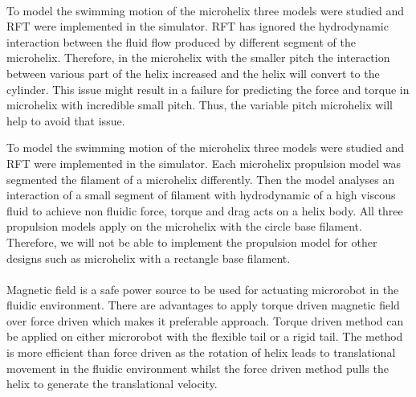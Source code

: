 \documentclass[12pt,a4paper,titlepage]{report}
\begin{document}
\paragraph{}

To model the swimming motion of the microhelix three models were studied and \ac*{RFT} were
 implemented in the simulator. \ac*{RFT} has ignored the 
hydrodynamic interaction between the fluid flow produced by different segment of the microhelix. 
Therefore, in the microhelix with the smaller pitch the interaction between various part of the helix
 increased and the helix will convert to the cylinder. This issue might result in a failure for predicting
 the force and torque in microhelix with incredible small pitch. Thus, the variable pitch microhelix will help to avoid that issue.  

To model the swimming motion of the microhelix three models were studied and \ac*{RFT} were
 implemented in the simulator. 
Each microhelix propulsion model was segmented the filament of a 
microhelix differently. Then the model analyses an interaction of a small segment of
 filament with hydrodynamic of a high viscous fluid to achieve non fluidic force, torque and drag 
acts on a helix body. All three propulsion models apply on the microhelix with the circle base 
filament. Therefore, we will not be able to implement the propulsion model for other designs such 
as microhelix with a rectangle base filament.   




\paragraph{}

Magnetic field is a safe power source to be used for actuating microrobot in the fluidic environment. 
There are advantages to apply torque driven magnetic field over force driven which makes it preferable
 approach. Torque driven method can be applied on either microrobot with the flexible tail or a rigid 
tail. The method is more efficient than force driven as the rotation of helix leads to translational 
movement in the fluidic environment whilst the force driven method pulls the helix to generate
 the translational velocity. 

\paragraph{}
\end{document}
